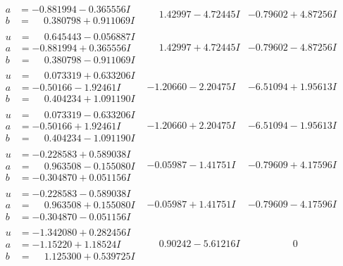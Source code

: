 \documentclass[1p]{elsarticle_modified}
\theoremstyle{definition}
\begin{document}
$$\begin{array}{c|c|c}
\begin{aligned}
a &= -0.881994 - 0.365556 I \\
b &= \phantom{-}0.380798 + 0.911069 I\end{aligned}
 & \phantom{-}1.42997 - 4.72445 I & -0.79602 + 4.87256 I \\ \hline\begin{aligned}
u &= \phantom{-}0.645443 - 0.056887 I \\
a &= -0.881994 + 0.365556 I \\
b &= \phantom{-}0.380798 - 0.911069 I\end{aligned}
 & \phantom{-}1.42997 + 4.72445 I & -0.79602 - 4.87256 I \\ \hline\begin{aligned}
u &= \phantom{-}0.073319 + 0.633206 I \\
a &= -0.50166 - 1.92461 I \\
b &= \phantom{-}0.404234 + 1.091190 I\end{aligned}
 & -1.20660 - 2.20475 I & -6.51094 + 1.95613 I \\ \hline\begin{aligned}
u &= \phantom{-}0.073319 - 0.633206 I \\
a &= -0.50166 + 1.92461 I \\
b &= \phantom{-}0.404234 - 1.091190 I\end{aligned}
 & -1.20660 + 2.20475 I & -6.51094 - 1.95613 I \\ \hline\begin{aligned}
u &= -0.228583 + 0.589038 I \\
a &= \phantom{-}0.963508 - 0.155080 I \\
b &= -0.304870 + 0.051156 I\end{aligned}
 & -0.05987 - 1.41751 I & -0.79609 + 4.17596 I \\ \hline\begin{aligned}
u &= -0.228583 - 0.589038 I \\
a &= \phantom{-}0.963508 + 0.155080 I \\
b &= -0.304870 - 0.051156 I\end{aligned}
 & -0.05987 + 1.41751 I & -0.79609 - 4.17596 I \\ \hline\begin{aligned}
u &= -1.342080 + 0.282456 I \\
a &= -1.15220 + 1.18524 I \\
b &= \phantom{-}1.125300 + 0.539725 I\end{aligned}
 & \phantom{-}0.90242 - 5.61216 I & \phantom{-0.000000 } 0 \\ \hline\begin{aligned}

\end{aligned}
\end{array}$$
\end{document}

